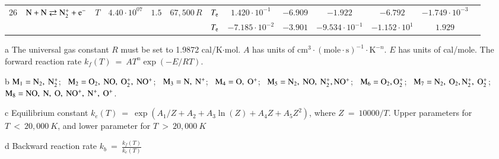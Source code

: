 \documentclass{warpdoc}
\begin{document}
\begin{table}[!ht]
\begin{center}
\begin{threeparttable}
\begin{tabular}{ccccccccccccc}
                                                                                    
26 & $\rm N + N \rightleftarrows N_2^{+} + e^{-}$ &$T$ & $4.40 \cdot 10^{07}$ & $1.5$ & $67,500\, R$ 
                                          &$T_{\rm e}$  & $1.420 \cdot 10^{-1}$  & $-6.909$  & $-1.922$ & $-6.792$ & $-1.749 \cdot 10^{-3}$ & \multirow{2}{*}{\cite{jtht:1993:park,ijhmt:2021:kim}} \\
 & & & & &                                &$T_{\rm e}$  & $-7.185 \cdot 10^{-2}$  & $-3.901$  & $-9.534 \cdot 10^{-1}$ & $-1.152 \cdot 10^{1}$ & $1.929$ & ~ \\
\bottomrule
\end{tabular}
\begin{tablenotes}
\item[{a}] The universal gas constant $R$ must be set to 1.9872	cal/K$\cdot$mol. $A$ has units of $\textrm{cm}^3\cdot(\textrm{mole}\cdot \textrm{s})^{-1}\cdot \textrm{K}^{-n}$. $E$ has units of cal/mole. The forward reaction rate $k_f(T) ~= ~A T^n \exp(-E/RT).$
\item[{b}] $\rm M_1=N_2,~N_2^+$;~ $\rm M_2=O_2,~NO,~O_2^+,~NO^+$;~ $\rm M_3=N,~N^+$;~ $\rm M_4=O,~O^+$; ~$\rm M_5=N_2,~NO,~N_2^+,NO^+$; ~$\rm M_6=O_2, O_2^+$; ~$\rm M_7=N_2,~O_2,N_2^+,~O_2^+$;~ $\rm M_8=NO,~N,~O,~NO^+,~N^+,~O^+$.
\item[{c}] Equilibrium constant $k_e(T) ~= ~\exp(A_1/Z + A_2 + A_3 \ln(Z) + A_4Z +A_5 Z^2)$, where $Z ~= ~10000/T $. Upper parameters for $T~<~20,000 ~K$, and lower parameter for $T~>~20,000 ~K$
\item[{d}] Backward reaction rate $k_b ~= ~\frac{k_f(T)}{k_e(T)}$
\end{tablenotes}
\label{tab:kim2021a}
\end{threeparttable}
\end{center}
\end{table}
% 
\end{document}
